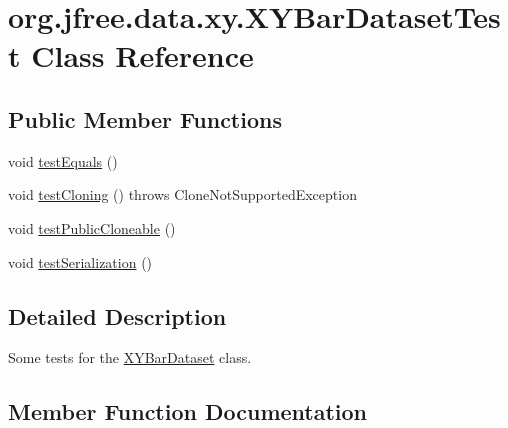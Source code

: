 \hypertarget{classorg_1_1jfree_1_1data_1_1xy_1_1_x_y_bar_dataset_test}{}\section{org.\+jfree.\+data.\+xy.\+X\+Y\+Bar\+Dataset\+Test Class Reference}
\label{classorg_1_1jfree_1_1data_1_1xy_1_1_x_y_bar_dataset_test}
\subsection*{Public Member Functions}
\begin{DoxyCompactItemize}
\item 
void \mbox{\hyperlink{classorg_1_1jfree_1_1data_1_1xy_1_1_x_y_bar_dataset_test_afc6f8a890974d380ec26d6ea02fa32f7}{test\+Equals}} ()
\item 
void \mbox{\hyperlink{classorg_1_1jfree_1_1data_1_1xy_1_1_x_y_bar_dataset_test_ac53ecc1ec31fd7f944bc7e09e88f46d4}{test\+Cloning}} ()  throws Clone\+Not\+Supported\+Exception 
\item 
void \mbox{\hyperlink{classorg_1_1jfree_1_1data_1_1xy_1_1_x_y_bar_dataset_test_a9288758bf55a0d282262503f9038a858}{test\+Public\+Cloneable}} ()
\item 
void \mbox{\hyperlink{classorg_1_1jfree_1_1data_1_1xy_1_1_x_y_bar_dataset_test_afff80bfa03a028f090ef008586cec4db}{test\+Serialization}} ()
\end{DoxyCompactItemize}


\subsection{Detailed Description}
Some tests for the \mbox{\hyperlink{classorg_1_1jfree_1_1data_1_1xy_1_1_x_y_bar_dataset}{X\+Y\+Bar\+Dataset}} class. 

\subsection{Member Function Documentation}
\mbox{\label{classorg_1_1jfree_1_1data_1_1xy_1_1_x_y_bar_dataset_test_ac53ecc1ec31fd7f944bc7e09e88f46d4}} 
